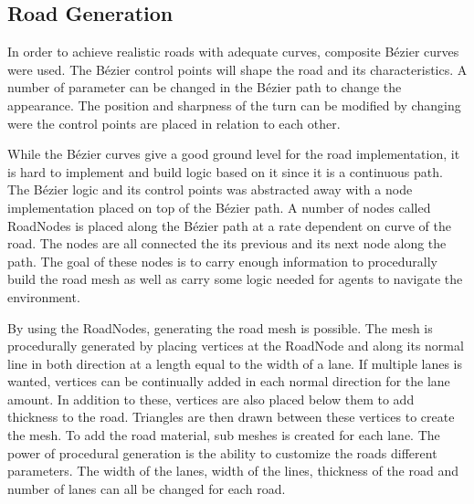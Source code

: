     \subsection{Road Generation}
        In order to achieve realistic roads with adequate curves, composite Bézier curves were used. The Bézier control points will shape the road and its characteristics. A number of parameter can be changed in the Bézier path to change the appearance. The position and sharpness of the turn can be modified by changing were the control points are placed in relation to each other. 
    
        While the Bézier curves give a good ground level for the road implementation, it is hard to implement and build logic based on it since it is a continuous path. The Bézier logic and its control points was abstracted away with a node implementation placed on top of the Bézier path. A number of nodes called RoadNodes is placed along the Bézier path at a rate dependent on curve of the road. The nodes are all connected the its previous and its next node along the path. The goal of these nodes is to carry enough information to procedurally  build the road mesh as well as carry some logic needed for agents to navigate the environment.
    
        By using the RoadNodes, generating the road mesh is possible. The mesh is procedurally generated by placing vertices at the RoadNode and along its normal line in both direction at a length equal to the width of a lane. If multiple lanes is wanted, vertices can be continually added in each normal direction for the lane amount. In addition to these, vertices are also placed below them to add thickness to the road. Triangles are then drawn between these vertices to create the mesh. To add the road material, sub meshes is created for each lane. The power of procedural generation is the ability to customize the roads different parameters. The width of the lanes, width of the lines, thickness of the road and number of lanes can all be changed for each road.
    
    
